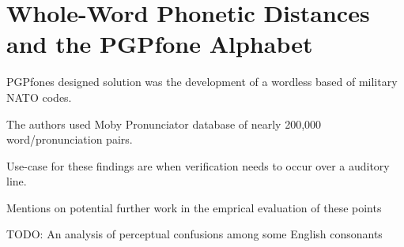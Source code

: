 \section{Whole-Word Phonetic Distances and the PGPfone Alphabet}

PGPfones designed solution was the development of a wordless based of military NATO codes.

The authors used Moby Pronunciator database of nearly 200,000 word/pronunciation pairs.

Use-case for these findings are when verification needs to occur over a auditory line.

Mentions on potential further work in the emprical evaluation of these points

TODO: An analysis of perceptual confusions among some English consonants
